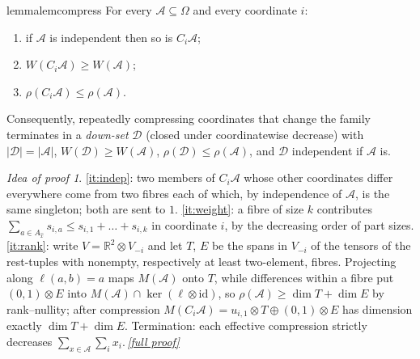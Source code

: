 \documentclass[11pt,a4paper]{article}
\theoremstyle{plain}
\theoremstyle{definition}
\theoremstyle{remark}
\newtheorem*{proofidea}{Idea of proof}
\newcommand{\fullproofref}[1]{\,\hyperref[#1]{\textit{[full proof]}}}
\newcommand{\R}{\mathbb R}
\newcommand{\cA}{\mathcal A}
\newcommand{\cD}{\mathcal D}
\newcommand{\Om}{\Omega}
\newcommand{\rk}{\rho}
\begin{document}
\begin{restatable}[Compression]{lemma}{lemcompress}\label{lem:compress}
For every $\cA\subseteq\Om$ and every coordinate $i$:
\begin{enumerate}[label=(\alph*),itemsep=1pt]
\item\label{it:indep} if $\cA$ is independent then so is $C_i\cA$;
\item\label{it:weight} $W(C_i\cA)\ge W(\cA)$;
\item\label{it:rank} $\rk(C_i\cA)\le\rk(\cA)$.
\end{enumerate}
Consequently, repeatedly compressing coordinates that change the family terminates in a \emph{down-set} $\cD$ (closed under coordinatewise decrease) with $|\cD|=|\cA|$, $W(\cD)\ge W(\cA)$, $\rk(\cD)\le\rk(\cA)$, and $\cD$ independent if $\cA$ is.
\end{restatable}
\begin{proofidea}
\ref{it:indep}: two members of $C_i\cA$ whose other coordinates differ everywhere come from two fibres each of which, by independence of $\cA$, is the same singleton; both are sent to $1$. \ref{it:weight}: a fibre of size $k$ contributes $\sum_{a\in A_{\hat x}}s_{i,a}\le s_{i,1}+\dots+s_{i,k}$ in coordinate $i$, by the decreasing order of part sizes. \ref{it:rank}: write $V=\R^2\otimes V_{-i}$ and let $T$, $E$ be the spans in $V_{-i}$ of the tensors of the rest-tuples with nonempty, respectively at least two-element, fibres. Projecting along $\ell(a,b)=a$ maps $M(\cA)$ onto $T$, while differences within a fibre put $(0,1)\otimes E$ into $M(\cA)\cap\ker(\ell\otimes\mathrm{id})$, so $\rk(\cA)\ge\dim T+\dim E$ by rank--nullity; after compression $M(C_i\cA)=u_{i,1}\otimes T\oplus(0,1)\otimes E$ has dimension exactly $\dim T+\dim E$. Termination: each effective compression strictly decreases $\sum_{x\in\cA}\sum_ix_i$.\fullproofref{pf:compress}
\end{proofidea}
\end{document}
